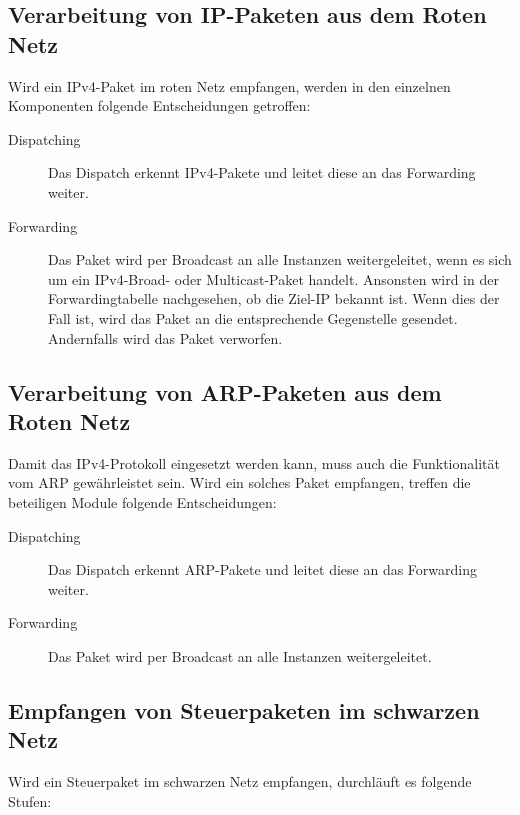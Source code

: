 \documentclass[a4paper, 11pt, ngerman, fleqn]{article}
\begin{document}
\subsection{Verarbeitung von IP-Paketen aus dem Roten Netz}

Wird ein IPv4-Paket im roten Netz empfangen, werden in den einzelnen Komponenten folgende Entscheidungen getroffen:

\begin{description}
	\item[Dispatching]
	Das Dispatch erkennt IPv4-Pakete und leitet diese an das Forwarding weiter.

	\item[Forwarding]
	Das Paket wird per Broadcast an alle Instanzen weitergeleitet, wenn es sich um ein IPv4-Broad- oder Multicast-Paket handelt.
	Ansonsten wird in der Forwardingtabelle nachgesehen, ob die Ziel-IP bekannt ist. 
	Wenn dies der Fall ist, wird das Paket an die entsprechende Gegenstelle gesendet.
	Andernfalls wird das Paket verworfen.  
	
\end{description}

\subsection{Verarbeitung von ARP-Paketen aus dem Roten Netz}

Damit das IPv4-Protokoll eingesetzt werden kann, muss auch die Funktionalität vom ARP gewährleistet sein.
Wird ein solches Paket empfangen, treffen die beteiligen Module folgende Entscheidungen:

\begin{description}
	\item[Dispatching]
	Das Dispatch erkennt ARP-Pakete und leitet diese an das Forwarding weiter.

	\item[Forwarding]
	Das Paket wird per Broadcast an alle Instanzen weitergeleitet.
\end{description}

\subsection{Empfangen von Steuerpaketen im schwarzen Netz}

Wird ein Steuerpaket im schwarzen Netz empfangen, durchläuft es folgende Stufen:
\end{document}
